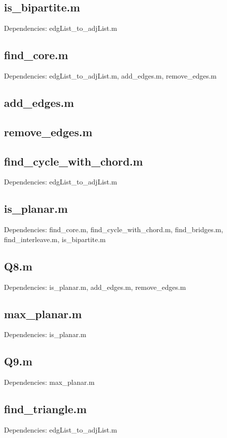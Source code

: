 \documentclass[a4paper]{article}
\begin{document}
\newpage
\subsection*{is\_bipartite.m}\label{Pis_bipartite}
Dependencies: edgList\_to\_adjList.m


\newpage
\subsection*{find\_core.m}\label{Pfind_core}
Dependencies: edgList\_to\_adjList.m, add\_edges.m, remove\_edges.m


\subsection*{add\_edges.m}\label{Padd_edges}


\subsection*{remove\_edges.m}\label{Premove_edges}


\newpage
\subsection*{find\_cycle\_with\_chord.m}\label{Pfind_cycle_with_chord}
Dependencies: edgList\_to\_adjList.m


\subsection*{is\_planar.m}\label{Pis_planar}
Dependencies: find\_core.m, find\_cycle\_with\_chord.m, find\_bridges.m, \newline
              find\_interleave.m, is\_bipartite.m


\newpage
\subsection*{Q8.m}\label{PQ8}
Dependencies: is\_planar.m, add\_edges.m, remove\_edges.m


\subsection*{max\_planar.m}\label{Pmax_planar}
Dependencies: is\_planar.m


\newpage
\subsection*{Q9.m}\label{PQ9}
Dependencies: max\_planar.m


\subsection*{find\_triangle.m}\label{Pfind_triangle}
Dependencies: edgList\_to\_adjList.m

\end{document}
